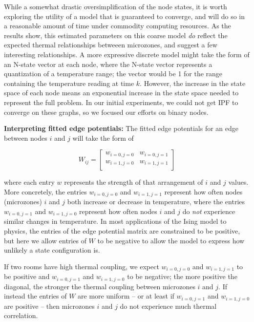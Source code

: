 While a somewhat drastic oversimplification of the node states, it is worth exploring the utility of a model that is guaranteed to converge, and will do so in a reasonable amount of time under commodity computing resources.
As the results show, this estimated parameters on this coarse model \emph{do} reflect the expected thermal relationships betweeen microzones, and suggest a few interesting relationships.
A more expressive discrete model might take the form of an N-state vector at each node, where the N-state vector represents a quantization of a temperature range; the vector would be 1 for the range containing the temperature reading at time $k$.
However, the increase in the state space of each node means an exponential increase in the state space needed to represent the full problem.
In our initial experiments, we could not get IPF to converge on these graphs, so we focused our efforts on binary nodes.

\textbf{Interpreting fitted edge potentials:} The fitted edge potentials for an edge between nodes $i$ and $j$ will take the form of

\begin{equation}
W_{ij} =
\begin{bmatrix}
w_{i=0,j=0} & w_{i=0,j=1} \\
w_{i=1,j=0} & w_{i=1,j=1} \\
\end{bmatrix}
\end{equation}

where each entry $w$ represents the strength of that arrangement of $i$ and $j$ values.
More concretely, the entries $w_{i=0,j=0}$ and $w_{i=1,j=1}$ represent how often nodes (microzones) $i$ and $j$ both increase or decrease in temperature, where the entries $w_{i=0,j=1}$ and $w_{i=1,j=0}$ represent how often nodes $i$ and $j$ do \emph{not} experience similar changes in temperature.
In most applications of the Ising model to physics, the entries of the edge potential matrix are constrained to be positive, but here we allow entries of $W$ to be negative to allow the model to express how unlikely a state configuration is.

If two rooms have high thermal coupling, we expect $w_{i=0,j=0}$ and $w_{i=1,j=1}$ to be positive and $w_{i=0,j=1}$ and $w_{i=1,j=0}$ to be negative; the more positive the diagonal, the stronger the thermal coupling between microzones $i$ and $j$.
If instead the entries of $W$ are more uniform -- or at least if $w_{i=0,j=1}$ and $w_{i=1,j=0}$ are positive -- then microzones $i$ and $j$ do not experience much thermal correlation.

